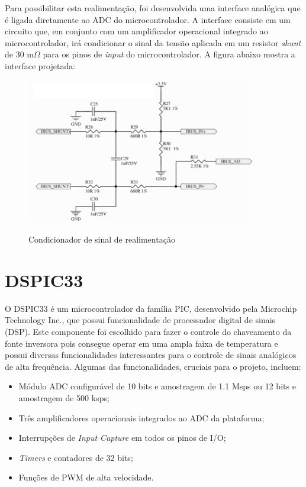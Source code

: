  Para possibilitar esta realimentação, foi desenvolvida uma interface analógica que é ligada diretamente ao ADC do microcontrolador. A interface consiste em um circuito que, em conjunto com um amplificador operacional integrado ao microcontrolador, irá condicionar o sinal da tensão aplicada em um resistor \textit{shunt} de 30 m$\Omega$ para os pinos de \textit{input} do microcontrolador. A figura abaixo mostra a interface projetada:

\begin{figure}[!htb]
    \centering
    \caption{Condicionador de sinal de realimentação}
    \includegraphics[width=0.9\textwidth]{./dados/figuras/proj-shunt}
    \label{fig:proj-shunt}
\end{figure}


\section{DSPIC33}
\label{sec:dsPIC}

O DSPIC33 é um microcontrolador da família PIC, desenvolvido pela Microchip Technology Inc., que possui funcionalidade de processador digital de sinais (DSP). Este componente foi escolhido para fazer o controle do chaveamento da fonte inversora pois consegue operar em uma ampla faixa de temperatura e possui diversas funcionalidades interessantes para o controle de sinais analógicos de alta frequência. Algumas das funcionalidades, cruciais para o projeto, incluem:

\begin{itemize}
    \item Módulo ADC configurável de 10 bits e amostragem de 1.1 Msps ou 12 bits e amostragem de 500 ksps;
    \item Três amplificadores operacionais integrados ao ADC da plataforma;
    \item Interrupções de \textit{Input Capture} em todos os pinos de I/O;
    \item \textit{Timers} e contadores de 32 bits;
    \item Funções de PWM de alta velocidade.
\end{itemize} 

